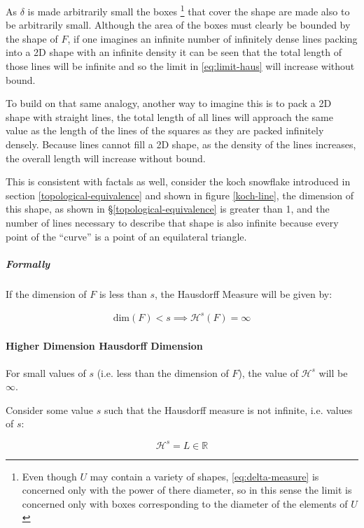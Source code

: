 \documentclass[a4paper,11pt,twoside]{article}
\begin{document}
As \(\delta\) is made arbitrarily small the boxes \footnote{Even though \(U\) may contain a variety of shapes, \eqref{eq:delta-measure} is concerned only with the power of there diameter, so in this sense the limit is concerned only with boxes corresponding to the diameter of the elements of \(U\)} that cover the shape are made also to be arbitrarily small. Although the area of the boxes must clearly be bounded by the shape of \(F\), if one imagines an infinite number of infinitely dense lines packing into a 2D shape with an infinite density it can be seen that the total length of those lines will be infinite and so the limit in \eqref{eq:limit-haus} will increase without bound.

To build on that same analogy, another way to imagine this is to pack a 2D shape with straight lines, the total length of all lines will approach the same value as the length of the lines of the squares as they are packed infinitely densely. Because lines cannot fill a 2D shape, as the density of the lines increases, the overall length will increase without bound.

This is consistent with factals as well, consider the koch snowflake introduced in section \ref{topological-equivalence} and shown in figure \ref{koch-line}, the dimension of this shape, as shown in \S \ref{topological-equivalence} is greater than 1, and the number of lines necessary to describe that shape is also infinite because every point of the ``curve'' is a point of an equilateral triangle.

\subparagraph{Formally}
\label{sec:org7750910}
If the dimension of \(F\) is less than \(s\), the Hausdorff Measure will be given by:

\begin{align}
\mathrm{dim}\left(  F \right ) < s \implies \mathcal{H}^{s} \left( F \right)  = \infty
\end{align}

\paragraph{Higher Dimension Hausdorff Dimension}
\label{sec:org340aa8e}


For small values of \(s\) (i.e. less than the dimension of  \(F\)), the value of \(\mathcal{H}^s\)  will be \(\infty\).

Consider some value \(s\) such that the Hausdorff measure is not infinite, i.e. values of \(s\):

\[
\mathcal{H}^s = L \in \mathbb{R}
\]
\end{document}
